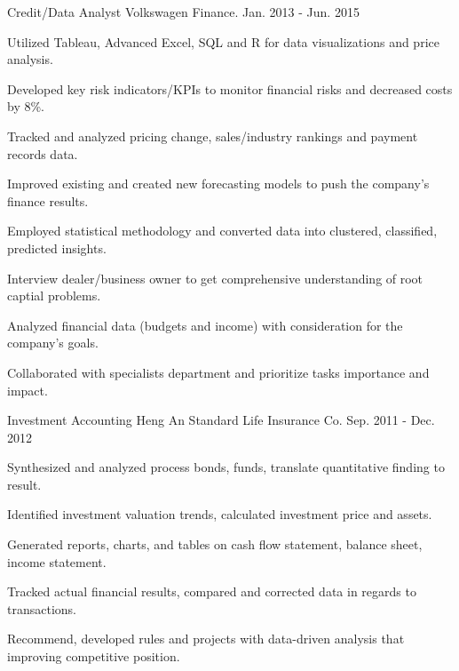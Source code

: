 \documentclass[11pt, a4paper]{awesome-cv}
\begin{document}


\begin{cventries}

  \cventry
    {Credit/Data Analyst} %
    {Volkswagen Finance.} %
    {} %
    {Jan. 2013 - Jun. 2015} %
    {
      \begin{cvitems} %
        \item {Utilized Tableau, Advanced Excel, SQL and R for data visualizations and price analysis.}
        \item {Developed key risk indicators/KPIs to monitor financial risks and decreased costs by 8\%.}
        \item {Tracked and analyzed pricing change, sales/industry rankings and payment records data.}
        \item {Improved existing and created new forecasting models to push the company's finance results.}
        \item {Employed statistical methodology and converted data into clustered, classified, predicted insights.}
        \item {Interview dealer/business owner to get comprehensive understanding of root captial problems.}
        \item {Analyzed financial data (budgets and income) with consideration for the company's goals.}
        \item {Collaborated with specialists department and prioritize tasks importance and impact.}
      \end{cvitems}
    }

  \cventry
    {Investment Accounting} %
    {Heng An Standard Life Insurance Co.} %
    {} %
    {Sep. 2011 - Dec. 2012} %
    {
      \begin{cvitems} %
        \item {Synthesized and analyzed process bonds, funds, translate quantitative finding to result.}
        \item {Identified investment valuation trends, calculated investment price and assets.}
        \item {Generated reports, charts, and tables on cash flow statement, balance sheet, income statement.}
        \item {Tracked actual financial results, compared and corrected data in regards to transactions.}
        \item {Recommend, developed rules and projects with data-driven analysis that improving competitive position.}
      \end{cvitems}
    }


\end{cventries}
\end{document}
